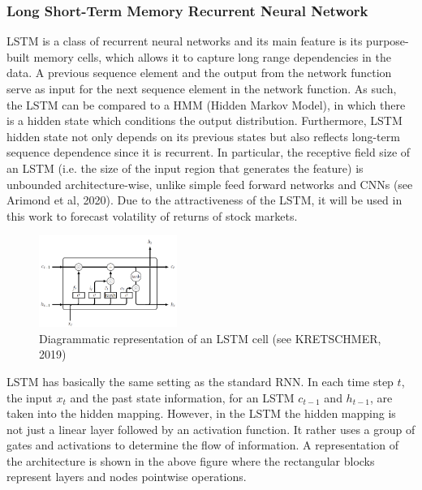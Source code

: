\documentclass[a4paper,11pt,oneside]{book}
\begin{document}
\subsubsection{Long Short-Term Memory Recurrent Neural Network}
LSTM is a class of recurrent neural networks and its main feature is its purpose-built memory cells, which allows it to capture long range dependencies in the data.\newline\newline
A previous sequence element and the output from the network function serve as input for the next sequence element in the network function. As such, the LSTM can be compared to a HMM (Hidden Markov Model), in which there is a hidden state which conditions the output distribution. Furthermore, LSTM hidden state not only depends on its previous states but also reflects long-term sequence dependence since it is recurrent. In particular, the receptive field size of an LSTM (i.e. the size of the input region that generates the feature) is unbounded architecture-wise, unlike simple feed forward networks and CNNs (see Arimond et al, 2020). Due to the attractiveness of the LSTM, it will be used in this work to forecast volatility of returns of stock markets. \newline\newline

\begin{figure}[h]
	\centering
	\includegraphics[width=0.4\textwidth]{figures/lstm}
	\caption{Diagrammatic representation of an LSTM cell  (see KRETSCHMER, 2019)}
	
	\label{lstm}
\end{figure}

LSTM has basically the same setting as the standard RNN. In each time step $t$, the input $x_t$ and the past state information, for an LSTM $c_{t-1}$ and $h_{t-1}$, are taken into the hidden mapping. However, in the LSTM the hidden mapping is not just a linear layer followed by an activation function. It rather uses a group of gates and activations to determine the flow of information. A representation of the architecture is shown in the above figure where the rectangular blocks represent layers and nodes pointwise operations.\newline\newline
\end{document}
